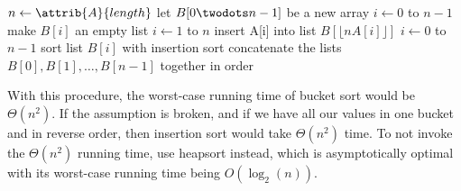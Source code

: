 \documentclass[12pt]{article}
\begin{document}
\begin{codebox}
\li $n \gets \attrib{A}{length}$
\li let $B[0 \twodots n-1]$ be a new array
\li \For $i \gets 0$ to $n-1$
\li     \Do
            make $B[i]$ an empty list
        \End
\li \For $i \gets 1$ to $n$
\li     \Do
            insert A[i] into list $B[\lfloor n A[i] \rfloor]$
        \End 
\li \For $i \gets 0$ to $n-1$
\li     \Do
            sort list $B[i]$ with insertion sort
        \End
\li concatenate the lists $B[0], B[1], \ldots, B[n-1]$ together in order
\end{codebox}

With this procedure, the worst-case running time of bucket sort would be $\Theta(n^{2})$. If the assumption is broken, and if we have all our values in one bucket and in reverse order, then insertion sort would take $\Theta(n^{2})$ time. To not invoke the $\Theta{(n^2)}$ running time, use heapsort instead, which is asymptotically optimal with its worst-case running time being $O(\log_2(n))$.
\end{document}
